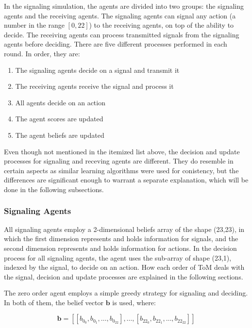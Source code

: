 In the signaling simulation, the agents are divided into two groups: the signaling agents and the receiving agents. The signaling agents can signal any action (a number in the range $[0,22]$) to the receiving agents, on top of the ability to decide. The receiving agents can process transmitted signals from the signaling agents before deciding. There are five different processes performed in each round. In order, they are:

\begin{enumerate}
    \item The signaling agents decide on a signal and transmit it
    \item The receiving agents receive the signal and process it
    \item All agents decide on an action
    \item The agent scores are updated  
    \item The agent beliefs are updated
\end{enumerate}

Even though not mentioned in the itemized list above, the decision and update processes for signaling and receving agents are different. They do resemble in certain aspects as similar learning algorithms were used for conistency, but the differences are significant enough to warrant a separate explanation, which will be done in the following subsections.

\subsubsection{Signaling Agents}

All signaling agents employ a 2-dimensional beliefs array of the shape (23,23), in which the first dimension represents and holds information for signals, and the second dimension represents and holds information for actions. In the decision process for all signaling agents, the agent uses the sub-array of shape (23,1), indexed by the signal, to decide on an action. How each order of ToM deals with the signal, decision and update processes are explained in the following sections.


The zero order agent employs a simple greedy strategy for signaling and deciding. In both of them, the belief vector $\mathbf{b}$ is used, where: 

\[
\mathbf{b} = [[b_{0_{0}}, b_{0_{1}}, \ldots, b_{0_{22}}], \ldots, [b_{22_{0}}, b_{22_{1}}, \ldots, b_{22_{22}}]]
\]

